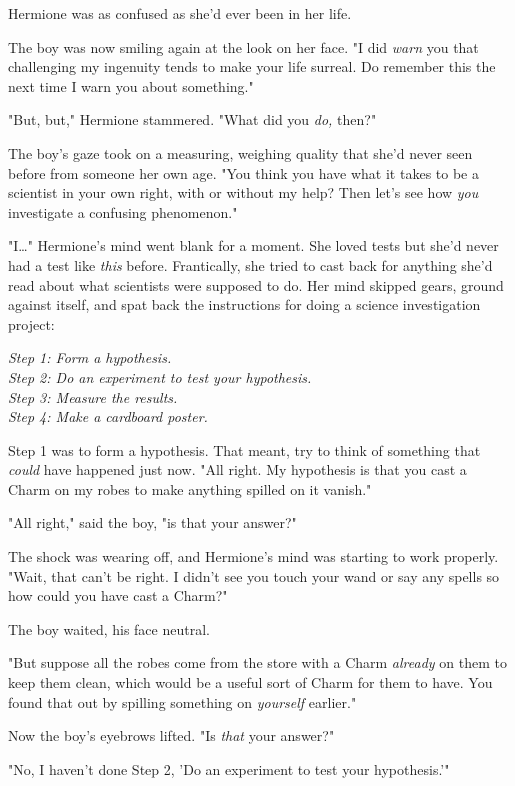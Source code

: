 Hermione was as confused as she'd ever been in her life.

The boy was now smiling again at the look on her face. "I did \emph{warn} you that challenging my ingenuity tends to make your life surreal. Do remember this the next time I warn you about something."

"But, but," Hermione stammered. "What did you \emph{do,} then?"

The boy's gaze took on a measuring, weighing quality that she'd never seen before from someone her own age. "You think you have what it takes to be a scientist in your own right, with or without my help? Then let's see how \emph{you} investigate a confusing phenomenon."

"I{\ldots}" Hermione's mind went blank for a moment. She loved tests but she'd never had a test like \emph{this} before. Frantically, she tried to cast back for anything she'd read about what scientists were supposed to do. Her mind skipped gears, ground against itself, and spat back the instructions for doing a science investigation project:

\emph{Step 1: Form a hypothesis.\\
Step 2: Do an experiment to test your hypothesis.\\
Step 3: Measure the results.\\
Step 4: Make a cardboard poster.}

Step 1 was to form a hypothesis. That meant, try to think of something that \emph{could} have happened just now. "All right. My hypothesis is that you cast a Charm on my robes to make anything spilled on it vanish."

"All right," said the boy, "is that your answer?"

The shock was wearing off, and Hermione's mind was starting to work properly. "Wait, that can't be right. I didn't see you touch your wand or say any spells so how could you have cast a Charm?"

The boy waited, his face neutral.

"But suppose all the robes come from the store with a Charm \emph{already} on them to keep them clean, which would be a useful sort of Charm for them to have. You found that out by spilling something on \emph{yourself} earlier."

Now the boy's eyebrows lifted. "Is \emph{that} your answer?"

"No, I haven't done Step 2, 'Do an experiment to test your hypothesis.'"

